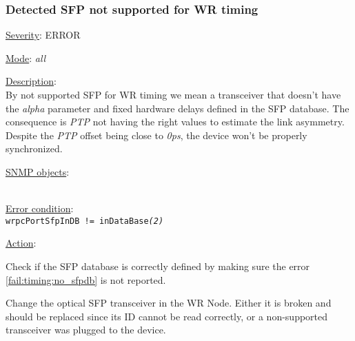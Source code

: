 \subsubsection{\bf Detected SFP not supported for WR timing}
		\label{fail:timing:wrong_sfp}
		\begin{pck_descr}
			\item [] \underline{Severity}: ERROR
			\item [] \underline{Mode}: \emph{all}
			\item [] \underline{Description}:\\
				By not supported SFP for WR timing we mean a transceiver that doesn't
				have the \emph{alpha} parameter and fixed hardware delays defined in the
				SFP database. The consequence is \emph{PTP} not having the right
				values to estimate the link asymmetry. Despite the \emph{PTP} offset
        being close to \emph{0ps}, the device won't be properly synchronized.
			\item [] \underline{SNMP objects}:\\
				{\footnotesize
				\\
				 }
			\item [] \underline{Error condition}:\\
				{\footnotesize
        \texttt{wrpcPortSfpInDB != inDataBase\emph{(2)}} }
      \item [] \underline{Action}:
        \begin{pck_proc}
        \item Check if the SFP database is correctly defined by making sure the
          error \ref{fail:timing:no_sfpdb} is not reported.
        \item Change the optical SFP transceiver in the WR Node. Either it is
          broken and should be replaced since its ID cannot be read correctly,
          or a non-supported transceiver was plugged to the device.
        \end{pck_proc}
		\end{pck_descr}


